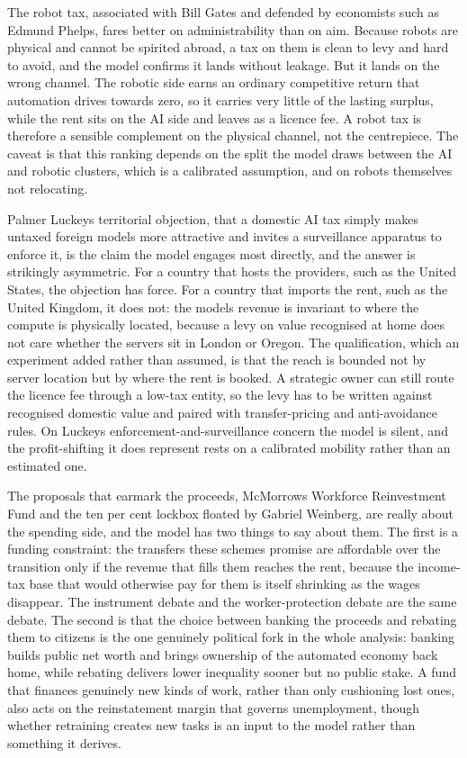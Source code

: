 \documentclass[11pt]{article}
\begin{document}
The robot tax, associated with Bill Gates and defended by economists
such as Edmund Phelps, fares better on administrability than on aim.
Because robots are physical and cannot be spirited abroad, a tax on them
is clean to levy and hard to avoid, and the model confirms it lands
without leakage. But it lands on the wrong channel. The robotic side
earns an ordinary competitive return that automation drives towards
zero, so it carries very little of the lasting surplus, while the rent
sits on the AI side and leaves as a licence fee. A robot tax is
therefore a sensible complement on the physical channel, not the
centrepiece. The caveat is that this ranking depends on the split the
model draws between the AI and robotic clusters, which is a calibrated
assumption, and on robots themselves not relocating.

Palmer Luckey\textquotesingle s territorial objection, that a domestic
AI tax simply makes untaxed foreign models more attractive and invites a
surveillance apparatus to enforce it, is the claim the model engages
most directly, and the answer is strikingly asymmetric. For a country
that hosts the providers, such as the United States, the objection has
force. For a country that imports the rent, such as the United Kingdom,
it does not: the model\textquotesingle s revenue is invariant to where
the compute is physically located, because a levy on value recognised at
home does not care whether the servers sit in London or Oregon. The
qualification, which an experiment added rather than assumed, is that
the reach is bounded not by server location but by where the rent is
booked. A strategic owner can still route the licence fee through a
low-tax entity, so the levy has to be written against recognised
domestic value and paired with transfer-pricing and anti-avoidance
rules. On Luckey\textquotesingle s enforcement-and-surveillance concern
the model is silent, and the profit-shifting it does represent rests on
a calibrated mobility rather than an estimated one.

The proposals that earmark the proceeds, McMorrow\textquotesingle s
Workforce Reinvestment Fund and the ten per cent lockbox floated by
Gabriel Weinberg, are really about the spending side, and the model has
two things to say about them. The first is a funding constraint: the
transfers these schemes promise are affordable over the transition only
if the revenue that fills them reaches the rent, because the income-tax
base that would otherwise pay for them is itself shrinking as the wages
disappear. The instrument debate and the worker-protection debate are
the same debate. The second is that the choice between banking the
proceeds and rebating them to citizens is the one genuinely political
fork in the whole analysis: banking builds public net worth and brings
ownership of the automated economy back home, while rebating delivers
lower inequality sooner but no public stake. A fund that finances
genuinely new kinds of work, rather than only cushioning lost ones, also
acts on the reinstatement margin that governs unemployment, though
whether retraining creates new tasks is an input to the model rather
than something it derives.
\end{document}
